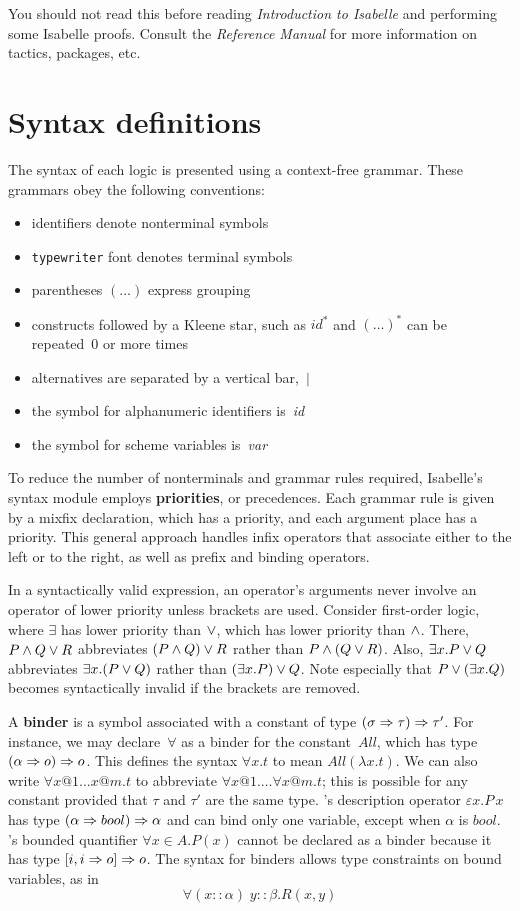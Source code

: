 You should not read this before reading {\em Introduction to Isabelle\/}
and performing some Isabelle proofs.  Consult the {\em Reference Manual}
for more information on tactics, packages, etc.


\section{Syntax definitions}
The syntax of each logic is presented using a context-free grammar.
These grammars obey the following conventions:
\begin{itemize}
\item identifiers denote nonterminal symbols
\item {\tt typewriter} font denotes terminal symbols
\item parentheses $(\ldots)$ express grouping
\item constructs followed by a Kleene star, such as $id^*$ and $(\ldots)^*$
can be repeated~0 or more times 
\item alternatives are separated by a vertical bar,~$|$
\item the symbol for alphanumeric identifiers is~{\it id\/} 
\item the symbol for scheme variables is~{\it var}
\end{itemize}
To reduce the number of nonterminals and grammar rules required, Isabelle's
syntax module employs {\bf priorities}, or precedences.
Each grammar rule is given by a mixfix declaration, which has a priority,
and each argument place has a priority.  This general approach handles
infix operators that associate either to the left or to the right, as well
as prefix and binding operators.

In a syntactically valid expression, an operator's arguments never involve
an operator of lower priority unless brackets are used.  Consider
first-order logic, where $\exists$ has lower priority than $\vee$,
which has lower priority than $\wedge$.  There, $P\wedge Q \vee R$
abbreviates $(P\wedge Q) \vee R$ rather than $P\wedge (Q\vee R)$.  Also,
$\exists x.P\vee Q$ abbreviates $\exists x.(P\vee Q)$ rather than
$(\exists x.P)\vee Q$.  Note especially that $P\vee(\exists x.Q)$
becomes syntactically invalid if the brackets are removed.

A {\bf binder} is a symbol associated with a constant of type
$(\sigma\Rightarrow\tau)\Rightarrow\tau'$.  For instance, we may declare~$\forall$ as
a binder for the constant~$All$, which has type $(\alpha\Rightarrow o)\Rightarrow o$.
This defines the syntax $\forall x.t$ to mean $All(\lambda x.t)$.  We
can also write $\forall x@1\ldots x@m.t$ to abbreviate $\forall x@1.
\ldots \forall x@m.t$; this is possible for any constant provided that
$\tau$ and $\tau'$ are the same type.  \HOL's description operator
$\varepsilon x.P\,x$ has type $(\alpha\Rightarrow bool)\Rightarrow\alpha$ and can bind
only one variable, except when $\alpha$ is $bool$.  \ZF's bounded
quantifier $\forall x\in A.P(x)$ cannot be declared as a binder
because it has type $[i, i\Rightarrow o]\Rightarrow o$.  The syntax for binders allows
type constraints on bound variables, as in
\[ \forall (x{::}\alpha) \; y{::}\beta. R(x,y) \]

